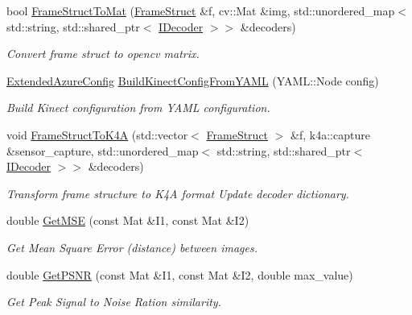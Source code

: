 \begin{DoxyCompactItemize}
\item 
bool \hyperlink{namespacemoetsi_1_1ssp_ac87377cef5da79f1a9cf7a4acdc42af6}{Frame\+Struct\+To\+Mat} (\hyperlink{structmoetsi_1_1ssp_1_1FrameStruct}{Frame\+Struct} \&f, cv\+::\+Mat \&img, std\+::unordered\+\_\+map$<$ std\+::string, std\+::shared\+\_\+ptr$<$ \hyperlink{classmoetsi_1_1ssp_1_1IDecoder}{I\+Decoder} $>$$>$ \&decoders)
\begin{DoxyCompactList}\small\item\em Convert frame struct to opencv matrix. \end{DoxyCompactList}\item 
\hyperlink{structmoetsi_1_1ssp_1_1ExtendedAzureConfig}{Extended\+Azure\+Config} \hyperlink{namespacemoetsi_1_1ssp_a357441ccde272e5d06fb708b62efa5c1}{Build\+Kinect\+Config\+From\+Y\+A\+ML} (Y\+A\+M\+L\+::\+Node config)
\begin{DoxyCompactList}\small\item\em Build Kinect configuration from Y\+A\+ML configuration. \end{DoxyCompactList}\item 
void \hyperlink{namespacemoetsi_1_1ssp_aa91f7040cdd17f24ad6760aa1bdb428d}{Frame\+Struct\+To\+K4A} (std\+::vector$<$ \hyperlink{structmoetsi_1_1ssp_1_1FrameStruct}{Frame\+Struct} $>$ \&f, k4a\+::capture \&sensor\+\_\+capture, std\+::unordered\+\_\+map$<$ std\+::string, std\+::shared\+\_\+ptr$<$ \hyperlink{classmoetsi_1_1ssp_1_1IDecoder}{I\+Decoder} $>$$>$ \&decoders)
\begin{DoxyCompactList}\small\item\em Transform frame structure to K4A format Update decoder dictionary. \end{DoxyCompactList}\item 
double \hyperlink{namespacemoetsi_1_1ssp_a3c49338af0ef5d208a34718fe29fc693}{Get\+M\+SE} (const Mat \&I1, const Mat \&I2)
\begin{DoxyCompactList}\small\item\em Get Mean Square Error (distance) between images. \end{DoxyCompactList}\item 
double \hyperlink{namespacemoetsi_1_1ssp_a0290f5110cb2cd2c9327c2fa6a528c84}{Get\+P\+S\+NR} (const Mat \&I1, const Mat \&I2, double max\+\_\+value)
\begin{DoxyCompactList}\small\item\em Get Peak Signal to Noise Ration similarity. \end{DoxyCompactList}\item 

\end{DoxyCompactItemize}

